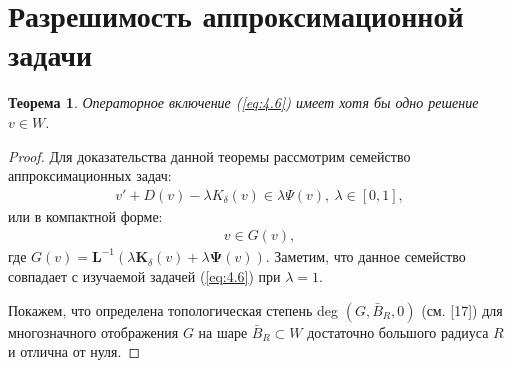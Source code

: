 \documentclass[14pt, a4paper]{extarticle}
\newtheorem{theorem}{Теорема}[section]
\numberwithin{equation}{section}
\begin{document}
    \section{Разрешимость аппроксимационной задачи}

    \begin{theorem}
        Операторное включение (\ref{eq:4.6}) имеет хотя бы одно решение $v \in W$.
    \end{theorem}
    \begin{proof}
        Для доказательства данной теоремы рассмотрим семейство аппроксимационных задач:
        \begin{equation}\label{eq:5.1}
            \begin{gathered}
                v' + D(v) - \lambda K_\delta(v) \in \lambda\Psi(v), \ \lambda \in [0,1],
            \end{gathered}
        \end{equation}
        \noindent или в компактной форме:
        \begin{equation}\label{eq:5.2}
            \begin{gathered}
                v \in G(v),
            \end{gathered}
        \end{equation}
        \noindent где $G(v) = \boldsymbol{L}^{-1} (\lambda\boldsymbol{K}_\delta(v) + \lambda\boldsymbol{\Psi}(v))$.
        Заметим, что данное семейство совпадает с изучаемой задачей (\ref{eq:4.6}) при $\lambda = 1$.

        Покажем, что определена топологическая степень deg $(G, \bar{B}_R, 0)$ (см. [17]) для многозначного
        отображения $G$ на шаре $\bar{B}_R \subset W$ достаточно большого радиуса $R$ и отлична от нуля.


\end{proof}
\end{document}
